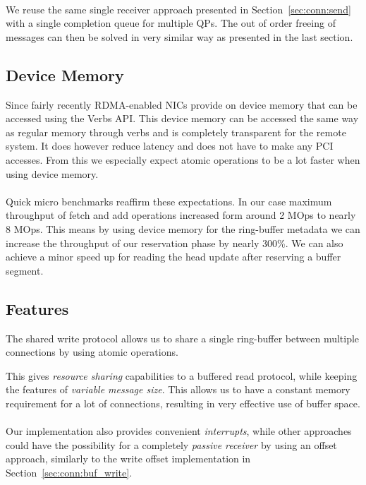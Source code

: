 \paragraph{} We reuse the same single receiver approach presented in Section~\ref{sec:conn:send} with a single completion queue for multiple
QPs. The out of order freeing of messages can then be solved in very similar way as presented in the last section.


\subsection{Device Memory}
Since fairly recently RDMA-enabled NICs provide on device memory that can be accessed using the Verbs API. This device memory can 
be accessed the same way as regular memory through verbs and is completely transparent for the remote system. It does however
reduce latency and does not have to make any PCI accesses. From this we especially expect atomic operations to be a lot faster
when using device memory.

\paragraph{} Quick micro benchmarks reaffirm these expectations. In our case maximum throughput of fetch and add operations 
increased form around 2 MOps to nearly 8 MOps. This means by using device memory for the ring-buffer metadata we can increase
the throughput of our reservation phase by nearly 300\%. We can also achieve a minor speed up for reading the head update after
reserving a buffer segment.


\subsection{Features}

The shared write protocol allows us to share a single ring-buffer between multiple connections by using atomic operations.

This gives \emph{resource sharing} capabilities to a buffered read protocol, while keeping the features of 
\emph{variable message size}. This allows us to have a constant memory requirement for a lot of connections,
resulting in very effective use of buffer space.


\paragraph{} Our implementation also provides convenient \emph{interrupts}, while other approaches could have the possibility 
for a completely \emph{passive receiver} by using an offset approach, similarly to the write offset implementation in 
Section~\ref{sec:conn:buf_write}.

